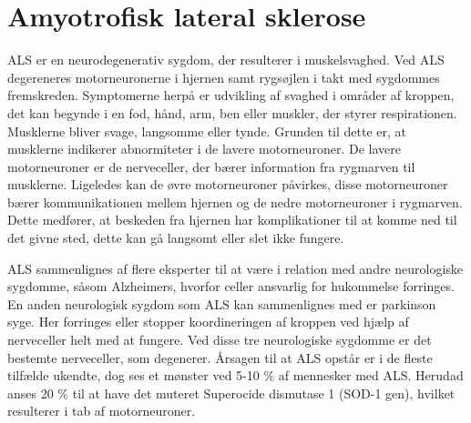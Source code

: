 \chapter{Amyotrofisk lateral sklerose}
ALS er en neurodegenerativ sygdom, der resulterer i muskelsvaghed. Ved ALS degereneres motorneuronerne i hjernen samt rygsøjlen i takt med sygdommes fremskreden. Symptomerne herpå er udvikling af svaghed i områder af kroppen, det kan begynde i en fod, hånd, arm, ben eller muskler, der styrer respirationen. Musklerne bliver svage, langsomme eller tynde. Grunden til dette er, at musklerne indikerer abnormiteter i de lavere motorneuroner. De lavere motorneuroner er de nerveceller, der bærer information fra rygmarven til musklerne. 
Ligeledes kan de øvre motorneuroner påvirkes, disse motorneuroner bærer kommunikationen mellem hjernen og de nedre motorneuroner i rygmarven. Dette medfører, at beskeden fra hjernen har komplikationer til at komme ned til det givne sted, dette kan gå langsomt eller slet ikke fungere. 

ALS sammenlignes af flere eksperter til at være i relation med andre neurologiske sygdomme, såsom Alzheimers, hvorfor celler ansvarlig for hukommelse forringes. En anden neurologisk sygdom som ALS kan sammenlignes med er parkinson syge. Her forringes eller stopper koordineringen af kroppen ved hjælp af nerveceller helt med at fungere. Ved disse tre neurologiske sygdomme er det bestemte nerveceller, som degenerer. 
Årsagen til at ALS opstår er i de fleste tilfælde ukendte, dog ses et mønster ved 5-10 \% af mennesker med ALS. Herudad anses 20 \% til at have det muteret Superocide dismutase 1 (SOD-1 gen), hvilket resulterer i tab af motorneuroner. 

